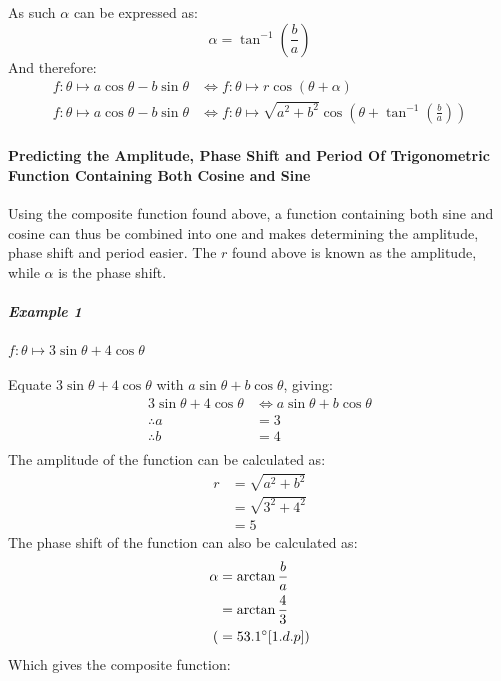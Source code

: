 \documentclass{article}
\begin{document}
        As such $\alpha$ can be expressed as:
        \begin{equation}
        \alpha = \tan^{-1}{\left( \frac{b}{a}\right) }
        \end{equation}
        And therefore:
        \begin{align*}
        f:\theta \mapsto a\cos\theta - b\sin\theta &\Leftrightarrow f:\theta \mapsto r\cos{(\theta + \alpha)} \\
        f:\theta \mapsto a\cos\theta - b\sin\theta &\Leftrightarrow f:\theta \mapsto \sqrt{a^2 + b^2}\cos{\left( \theta + \tan^{-1}{\left( \frac{b}{a}\right) }\right) }
        \end{align*} \newpage
        \paragraph{Predicting the Amplitude, Phase Shift and Period Of Trigonometric Function Containing Both Cosine and Sine} Using the composite function found above, a function containing both sine and cosine can thus be combined into one and makes determining the amplitude, phase shift and period easier. The $r$ found above is known as the amplitude, while $\alpha$ is the phase shift.
        \subparagraph{Example 1} $f:\theta \mapsto 3\sin{\theta} + 4\cos{\theta}$ \\\\
        Equate $3\sin{\theta} + 4\cos{\theta}$ with $a\sin{\theta} + b\cos{\theta}$, giving:
        \begin{align*}
        	3\sin{\theta} + 4\cos{\theta} &\Leftrightarrow a\sin{\theta} + b\cos{\theta} \\
        	\therefore a &= 3 \\
        	\therefore b &= 4 \\
        \end{align*}
        The amplitude of the function can be calculated as:
		\begin{align*}
			r &= \sqrt{a^2 + b^2} \\
			&= \sqrt{3^2 + 4^2} \\
			&= 5
		\end{align*}
		The phase shift of the function can also be calculated as:
		\begin{align*}
			\alpha &= \arctan{\frac{b}{a}} \\
			&= \arctan{\frac{4}{3}} \\
			(&= 53.1\degree [1.d.p]) 
		\end{align*}
        Which gives the composite function:
\end{document}
